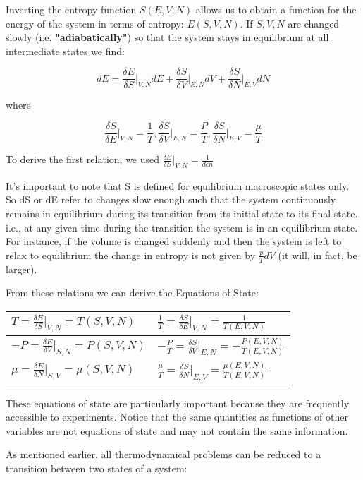 \documentclass{book}
\newcommand{\thermdif}[4]{\frac{\delta#1}{\delta#2}\vert_{#3,#4}}
\begin{document}
Inverting the entropy function $S(E,V,N)$ allows us to obtain a function for the energy of the system in terms of entropy: $E(S,V,N)$.  If $S,V,N$ are changed slowly (i.e. \textbf{"adiabatically"}) so that the system stays in equilibrium at all intermediate states we find:

$$dE=\thermdif{E}{S}{V}{N}dE+\thermdif{S}{V}{E}{N}dV+\thermdif{S}{N}{E}{V}dN$$

where

$$\thermdif{S}{E}{V}{N}=\frac{1}{T}, \thermdif{S}{V}{E}{N}=\frac{P}{T}, \thermdif{S}{N}{E}{V}=\frac{\mu}{T}$$

To derive the first relation, we used $\thermdif{E}{S}{V}{N}=\frac{1}{den}$


It's important to note that S is defined for equilibrium macroscopic states only.  So dS or dE refer to changes slow enough such that the system continuously remains in equilibrium during its transition from its initial state to its final state.  i.e., at any given time during the transition the system is in an equilibrium state.  For instance, if the volume is changed suddenly and then the system is left to relax to equilibrium the change in entropy is not given by $\frac{p}{T}dV$ (it will, in fact, be larger). 

From these relations we can derive the Equations of State:

\begin{tabu} to 0.8\textwidth { | X[l] | X[r] | }
	\hline
	$T=\thermdif{E}{S}{V}{N}=T(S,V,N)$ & $\frac{1}{T}=\thermdif{S}{E}{V}{N}=\frac{1}{T(E,V,N)}$ \\
	\hline
	$-P=\thermdif{E}{V}{S}{N}=P(S,V,N)$ & $-\frac{P}{T}=\thermdif{S}{V}{E}{N}=-\frac{P(E,V,N)}{T(E,V,N)}$ \\
	\hline
	$\mu=\thermdif{E}{N}{S}{V}=\mu(S,V,N)$ & $\frac{\mu}{T}=\thermdif{S}{N}{E}{V}=\frac{\mu(E,V,N)}{T(E,V,N)}$ \\
	\hline
\end{tabu}

These equations of state are particularly important because they are frequently accessible to experiments.  Notice that the same quantities as functions of other variables are \underline{not} equations of state and may not contain the same information. 

As mentioned earlier, all thermodynamical problems can be reduced to a transition between two states of a system:

\end{document}
